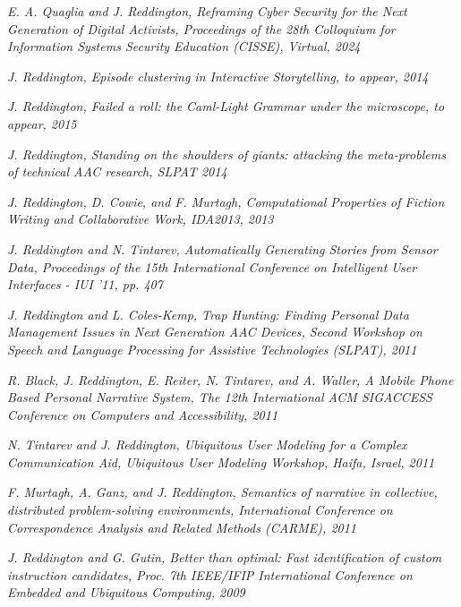 \documentclass[10pt]{article}
\makeatletter
\newlength{\bibhang}
\newlength{\bibsep}
 {\@listi \global\bibsep\itemsep \global\advance\bibsep by\parsep}
\newenvironment{bibsection}%
        {\vspace{-\baselineskip}\begin{list}{}{%
       \setlength{\leftmargin}{\bibhang}%
       \setlength{\itemindent}{-\leftmargin}%
       \setlength{\itemsep}{\bibsep}%
       \setlength{\parsep}{\z@}%
        \setlength{\partopsep}{0pt}%
        \setlength{\topsep}{0pt}}}
        {\end{list}\vspace{-.6\baselineskip}}
\makeatother
\begin{document}
\begin{bibsection}
\item{\em E. A. Quaglia and J. Reddington, Reframing Cyber Security for the Next Generation of Digital Activists, Proceedings of the 28th Colloquium for Information Systems Security Education (CISSE), Virtual, 2024}

\item{\em J. Reddington, Episode clustering in Interactive Storytelling, to appear, 2014}

\item{\em J. Reddington, Failed a roll: the Caml-Light Grammar under the microscope, to appear, 2015}

\item{\em J. Reddington, Standing on the shoulders of giants: attacking the meta-problems of technical AAC research, SLPAT 2014}

\item{\em J. Reddington, D. Cowie, and F. Murtagh, Computational Properties of Fiction Writing and Collaborative Work, IDA2013, 2013}

\item{\em J. Reddington and N. Tintarev, Automatically Generating Stories from Sensor Data, Proceedings of the 15th International Conference on Intelligent User Interfaces - IUI '11, pp. 407}

\item{\em J. Reddington and L. Coles-Kemp, Trap Hunting: Finding Personal Data Management Issues in Next Generation AAC Devices, Second Workshop on Speech and Language Processing for Assistive Technologies (SLPAT), 2011}

\item{\em R. Black, J. Reddington, E. Reiter, N. Tintarev, and A. Waller, A Mobile Phone Based Personal Narrative System, The 12th International ACM SIGACCESS Conference on Computers and Accessibility, 2011}

\item{\em N. Tintarev and J. Reddington, Ubiquitous User Modeling for a Complex Communication Aid, Ubiquitous User Modeling Workshop, Haifa, Israel, 2011}

\item{\em F. Murtagh, A. Ganz, and J. Reddington, Semantics of narrative in collective, distributed problem-solving environments, International Conference on Correspondence Analysis and Related Methods (CARME), 2011}

\item{\em J. Reddington and G. Gutin, Better than optimal: Fast identification of custom instruction candidates, Proc. 7th IEEE/IFIP International Conference on Embedded and Ubiquitous Computing, 2009}


\end{bibsection}
\end{document}
